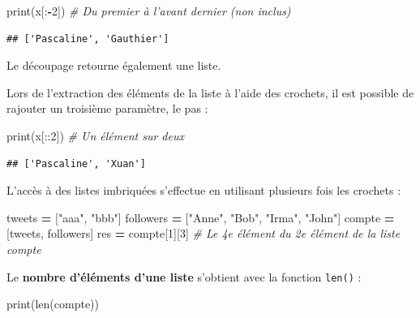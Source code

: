 \documentclass[12pt,]{book}
\newenvironment{Shaded}{\begin{snugshade}}{\end{snugshade}}
\newcommand{\DecValTok}[1]{\textcolor[rgb]{0.00,0.00,0.81}{#1}}
\newcommand{\StringTok}[1]{\textcolor[rgb]{0.31,0.60,0.02}{#1}}
\newcommand{\CommentTok}[1]{\textcolor[rgb]{0.56,0.35,0.01}{\textit{#1}}}
\newcommand{\OperatorTok}[1]{\textcolor[rgb]{0.81,0.36,0.00}{\textbf{#1}}}
\newcommand{\BuiltInTok}[1]{#1}
\newcommand{\NormalTok}[1]{#1}
\numberwithin{equation}{section}
\numberwithin{countremarque}{section}
\let\BeginKnitrBlock\begin \let\EndKnitrBlock\end
\begin{document}
\begin{Shaded}
\begin{Highlighting}[]
\BuiltInTok{print}\NormalTok{(x[:}\OperatorTok{-}\DecValTok{2}\NormalTok{]) }\CommentTok{# Du premier à l'avant dernier (non inclus)}
\end{Highlighting}
\end{Shaded}

\begin{lstlisting}
## ['Pascaline', 'Gauthier']
\end{lstlisting}

\BeginKnitrBlock{remarque}
Le découpage retourne également une liste.
\EndKnitrBlock{remarque}

Lors de l'extraction des éléments de la liste à l'aide des crochets, il
est possible de rajouter un troisième paramètre, le pas :

\begin{Shaded}
\begin{Highlighting}[]
\BuiltInTok{print}\NormalTok{(x[::}\DecValTok{2}\NormalTok{]) }\CommentTok{# Un élément sur deux}
\end{Highlighting}
\end{Shaded}

\begin{lstlisting}
## ['Pascaline', 'Xuan']
\end{lstlisting}

L'accès à des listes imbriquées s'effectue en utilisant plusieurs fois
les crochets :

\begin{Shaded}
\begin{Highlighting}[]
\NormalTok{tweets }\OperatorTok{=}\NormalTok{ [}\StringTok{"aaa"}\NormalTok{, }\StringTok{"bbb"}\NormalTok{]}
\NormalTok{followers }\OperatorTok{=}\NormalTok{ [}\StringTok{"Anne"}\NormalTok{, }\StringTok{"Bob"}\NormalTok{, }\StringTok{"Irma"}\NormalTok{, }\StringTok{"John"}\NormalTok{]}
\NormalTok{compte }\OperatorTok{=}\NormalTok{ [tweets, followers]}
\NormalTok{res }\OperatorTok{=}\NormalTok{ compte[}\DecValTok{1}\NormalTok{][}\DecValTok{3}\NormalTok{] }\CommentTok{# Le 4e élément du 2e élément de la liste compte}
\end{Highlighting}
\end{Shaded}

Le \textbf{nombre d'éléments d'une liste} s'obtient avec la fonction
\texttt{len()} :

\begin{Shaded}
\begin{Highlighting}[]
\BuiltInTok{print}\NormalTok{(}\BuiltInTok{len}\NormalTok{(compte))}
\end{Highlighting}
\end{Shaded}
\end{document}
